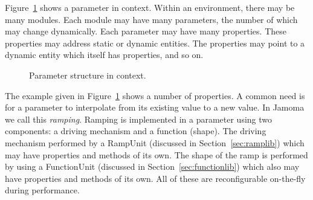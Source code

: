 \documentclass{article}
\begin{document}
Figure~\ref{fig:structure} shows a parameter in context. Within an environment, there may be many modules. Each module may have many parameters, the number of which may change dynamically. Each parameter may have many properties. These properties may address static or dynamic entities. The properties may point to a dynamic entity which itself has properties, and so on.

\begin{figure}
\centerline{}
\caption{Parameter structure in context.}
\label{fig:structure}
\end{figure}

The example given in Figure~\ref{fig:structure} shows a number of properties. A common need is for a parameter to interpolate from its existing value to a new value.  In Jamoma we call this \emph{ramping}. Ramping is implemented in a parameter using two components: a driving mechanism and a function (shape). The driving mechanism performed by a RampUnit (discussed in Section~\ref{sec:ramplib}) which may have properties and methods of its own. The shape of the ramp is performed by using a FunctionUnit (discussed in Section~\ref{sec:functionlib}) which also may have properties and methods of its own. All of these are reconfigurable on-the-fly during performance.



\end{document}
